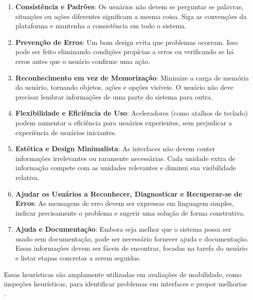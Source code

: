 {\begin{enumerate}
        \item \textbf{Consistência e Padrões}: Os usuários não devem se perguntar se palavras, situações ou ações diferentes significam a mesma coisa. Siga as convenções da plataforma e mantenha a consistência em todo o sistema.
    
        \item \textbf{Prevenção de Erros}: Um bom design evita que problemas ocorram. Isso pode ser feito eliminando condições propícias a erros ou verificando se há erros antes que o usuário confirme uma ação.
    
        \item \textbf{Reconhecimento em vez de Memorização}: Minimize a carga de memória do usuário, tornando objetos, ações e opções visíveis. O usuário não deve precisar lembrar informações de uma parte do sistema para outra.
    
        \item \textbf{Flexibilidade e Eficiência de Uso}: Aceleradores (como atalhos de teclado) podem aumentar a eficiência para usuários experientes, sem prejudicar a experiência de usuários iniciantes.
    
        \item \textbf{Estética e Design Minimalista}: As interfaces não devem conter informações irrelevantes ou raramente necessárias. Cada unidade extra de informação compete com as unidades relevantes e diminui sua visibilidade relativa.
    
        \item \textbf{Ajudar os Usuários a Reconhecer, Diagnosticar e Recuperar-se de Erros}: As mensagens de erro devem ser expressas em linguagem simples, indicar precisamente o problema e sugerir uma solução de forma construtiva.
    
        \item \textbf{Ajuda e Documentação}: Embora seja melhor que o sistema possa ser usado sem documentação, pode ser necessário fornecer ajuda e documentação. Essas informações devem ser fáceis de encontrar, focadas na tarefa do usuário e listar etapas concretas a serem seguidas.
    \end{enumerate}
    
    Essas heurísticas são amplamente utilizadas em avaliações de usabilidade, como inspeções heurísticas, para identificar problemas em interfaces e propor melhorias \citep{Nielsen1994}.
    
}
